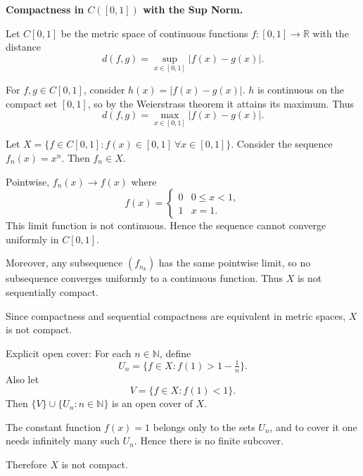 \begin{problem}[CP-II-0013]
\label{prob:cp-ii-0013}
\textbf{Compactness in \(C([0,1])\) with the Sup Norm.}

\hspace*{1.5em}Let $C[0,1]$ be the metric space of continuous functions $f:[0,1]\to\mathbb{R}$ with the distance
\[
d(f,g) = \sup_{x\in[0,1]} |f(x)-g(x)|.
\]

For $f,g\in C[0,1]$, consider $h(x)=|f(x)-g(x)|$.
$h$ is continuous on the compact set $[0,1]$, so by the Weierstrass theorem it attains its maximum.
Thus
\[
d(f,g)=\max_{x\in[0,1]}|f(x)-g(x)|.
\]

Let $X=\{f\in C[0,1]: f(x)\in[0,1]\ \forall x\in[0,1]\}$.
Consider the sequence $f_n(x)=x^n$. Then $f_n\in X$.

Pointwise, $f_n(x)\to f(x)$ where
\[
f(x)=\begin{cases}
	0 & 0\leq x<1,\\
	1 & x=1.
\end{cases}
\]
This limit function is not continuous. Hence the sequence cannot converge uniformly in $C[0,1]$.

Moreover, any subsequence $(f_{n_k})$ has the same pointwise limit, so no subsequence converges uniformly to a continuous function.
Thus $X$ is not sequentially compact.

Since compactness and sequential compactness are equivalent in metric spaces, $X$ is not compact.

Explicit open cover: For each $n\in\mathbb{N}$, define
\[
U_n=\{f\in X : f(1) > 1 - \tfrac{1}{n}\}.
\]
Also let
\[
V=\{f\in X : f(1)<1\}.
\]
Then $\{V\}\cup\{U_n: n\in\mathbb{N}\}$ is an open cover of $X$.

The constant function $f(x)=1$ belongs only to the sets $U_n$, and to cover it one needs infinitely many such $U_n$. Hence there is no finite subcover.

Therefore $X$ is not compact.

\end{problem}

